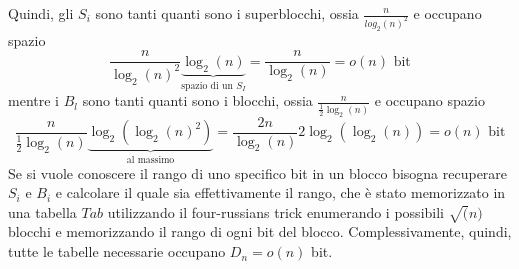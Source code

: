 \noindent
Quindi, gli $S_i$ sono tanti quanti sono i superblocchi, ossia $\frac{n}{log_2(n)^2}$ e occupano spazio
$$
	\frac{n}{\log_2(n)^2} \underbrace{\log_2(n)}_{\text{spazio di un } S_I} = \frac{n}{\log_2(n)} = o(n) \text{ bit}
$$
mentre i $B_l$ sono tanti quanti sono i blocchi, ossia $\frac{n}{\frac{1}{2}\log_2(n)}$ e occupano spazio
$$
	\frac{n}{\frac{1}{2}\log_2(n)} \underbrace{\log_2(\log_2(n)^2)}_{\text{al massimo}} =
	\frac{2n}{\log_2(n)} 2 \log_2(\log_2(n)) = o(n) \text{ bit}
$$
Se si vuole conoscere il rango di uno specifico bit in un blocco bisogna
recuperare $S_i$ e $B_i$ e calcolare il quale sia effettivamente il rango, che
è stato memorizzato in una tabella $Tab$ utilizzando il four-russians trick
enumerando i possibili $\sqrt(n)$ blocchi e memorizzando il rango di ogni
bit del blocco. Complessivamente, quindi, tutte le tabelle necessarie occupano
$D_n = o(n)$ bit.

